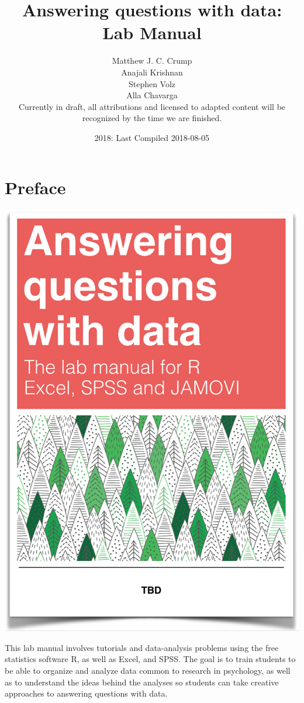 \documentclass[]{book}
\title{Answering questions with data: Lab Manual}
\author{Matthew J. C. Crump \\ Anajali Krishnan \\ Stephen Volz \\ Alla Chavarga \\ Currently in draft, all attributions and licensed to adapted content
will be recognized by the time we are finished.}
\date{2018: Last Compiled 2018-08-05}
\theoremstyle{definition}
\theoremstyle{definition}
\theoremstyle{definition}
\theoremstyle{remark}
\begin{document}
\maketitle

{
\setcounter{tocdepth}{1}
\tableofcontents
}
\chapter*{Preface}\label{preface}

\begin{center}\includegraphics[width=12.5in]{LabmanualCover} \end{center}

This lab manual involves tutorials and data-analysis problems using the
free statistics software R, as well as Excel, and SPSS. The goal is to
train students to be able to organize and analyze data common to
research in psychology, as well as to understand the ideas behind the
analyses so students can take creative approaches to answering questions
with data.
\end{document}
